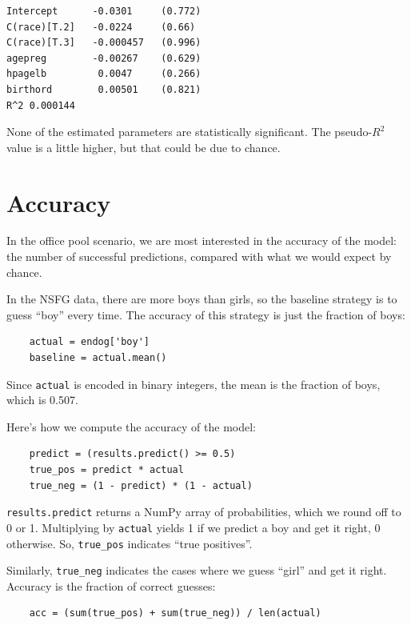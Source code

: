 \documentclass[12pt]{book}
\theoremstyle{exercise}
\begin{document}
\begin{verbatim}
Intercept      -0.0301     (0.772)
C(race)[T.2]   -0.0224     (0.66)
C(race)[T.3]   -0.000457   (0.996)
agepreg        -0.00267    (0.629)
hpagelb         0.0047     (0.266)
birthord        0.00501    (0.821)
R^2 0.000144
\end{verbatim}

None of the estimated parameters are statistically significant.  The
pseudo-$R^2$ value is a little higher, but that could be due to
chance.%
%
%


\section{Accuracy}%
\label{accuracy}

In the office pool scenario,
we are most interested in the accuracy of the model:
the number of successful predictions, compared with what we would
expect by chance.%
%

In the NSFG data, there are more boys than girls, so the baseline
strategy is to guess ``boy'' every time.  The accuracy of this
strategy is just the fraction of boys:

\begin{verbatim}
    actual = endog['boy']
    baseline = actual.mean()
\end{verbatim}

Since {\tt actual} is encoded in binary integers, the mean is the
fraction of boys, which is 0.507.

Here's how we compute the accuracy of the model:

\begin{verbatim}
    predict = (results.predict() >= 0.5)
    true_pos = predict * actual
    true_neg = (1 - predict) * (1 - actual)
\end{verbatim}

{\tt results.predict} returns a NumPy array of probabilities, which we
round off to 0 or 1.  Multiplying by {\tt actual}
yields 1 if we predict a boy and get it right, 0 otherwise.  So,
\verb"true_pos" indicates ``true positives''.%
%
%

Similarly, \verb"true_neg" indicates the cases where we guess ``girl''
and get it right.  Accuracy is the fraction of correct guesses:

\begin{verbatim}
    acc = (sum(true_pos) + sum(true_neg)) / len(actual)
\end{verbatim}
\end{document}
